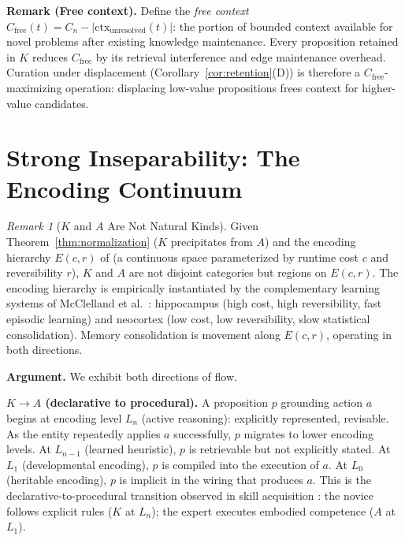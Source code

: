 \documentclass[11pt]{article}
\theoremstyle{definition}
\theoremstyle{remark}
\newtheorem*{remark}{Remark}
\begin{document}
\textbf{Remark (Free context).}
Define the \emph{free context} $C_{\mathrm{free}}(t) = C_n -
|\mathrm{ctx}_{\mathrm{unresolved}}(t)|$: the portion of bounded context
available for novel problems after existing knowledge maintenance.
Every proposition retained in $K$ reduces $C_{\mathrm{free}}$ by its
retrieval interference and edge maintenance overhead. Curation under
displacement (Corollary~\ref{cor:retention}(D)) is therefore a
$C_{\mathrm{free}}$-maximizing operation: displacing low-value
propositions frees context for higher-value candidates.

\section{Strong Inseparability: The Encoding Continuum}
\label{sec:continuum}

\begin{remark}[$K$ and $A$ Are Not Natural Kinds]
\label{rem:continuum}
Given Theorem~\ref{thm:normalization} ($K$ precipitates from $A$) and
the encoding hierarchy $E(c,r)$ of \cite{McCarthy2026c} (a continuous
space parameterized by runtime cost $c$ and reversibility $r$), $K$ and
$A$ are not disjoint categories but regions on $E(c,r)$. The encoding
hierarchy is empirically instantiated by the complementary learning
systems of McClelland et al.\ \cite{McClelland1995}: hippocampus (high
cost, high reversibility, fast episodic learning) and neocortex (low
cost, low reversibility, slow statistical consolidation). Memory
consolidation is movement along $E(c,r)$, operating in both directions.
\end{remark}

\textbf{Argument.}
We exhibit both directions of flow.

\textbf{$K \to A$ (declarative to procedural).}
A proposition $p$ grounding action $a$ begins at encoding level $L_n$
(active reasoning): explicitly represented, revisable. As the entity
repeatedly applies $a$ successfully, $p$ migrates to lower encoding
levels. At $L_{n-1}$ (learned heuristic), $p$ is retrievable but not
explicitly stated. At $L_1$ (developmental encoding), $p$ is compiled
into the execution of $a$. At $L_0$ (heritable encoding), $p$ is
implicit in the wiring that produces $a$. This is the
declarative-to-procedural transition observed in skill acquisition
\cite{FittsPosner1967}: the novice follows explicit rules ($K$ at
$L_n$); the expert executes embodied competence ($A$ at $L_1$).
\end{document}
